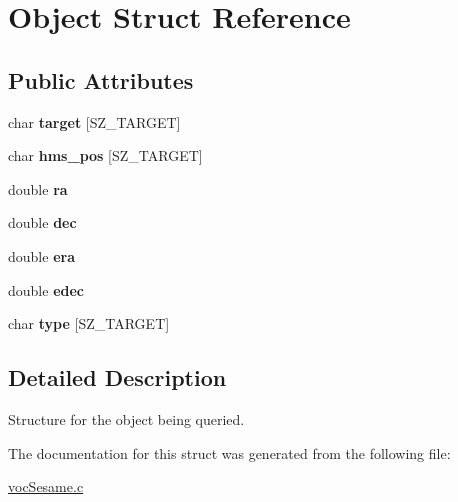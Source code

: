 \hypertarget{structObject}{
\section{Object Struct Reference}
\label{structObject}
}
\subsection*{Public Attributes}
\begin{CompactItemize}
\item 
\hypertarget{structObject_a8132cc4ab5e191de82b257172c67c03}{
char \textbf{target} \mbox{[}SZ\_\-TARGET\mbox{]}}
\label{structObject_a8132cc4ab5e191de82b257172c67c03}

\item 
\hypertarget{structObject_607a5e695e1b0f9a077b76b0d640e23a}{
char \textbf{hms\_\-pos} \mbox{[}SZ\_\-TARGET\mbox{]}}
\label{structObject_607a5e695e1b0f9a077b76b0d640e23a}

\item 
\hypertarget{structObject_4d7b960d76d5ea50bb92efedc3c68878}{
double \textbf{ra}}
\label{structObject_4d7b960d76d5ea50bb92efedc3c68878}

\item 
\hypertarget{structObject_a6e49034ae594ec8685489ea90cc2bac}{
double \textbf{dec}}
\label{structObject_a6e49034ae594ec8685489ea90cc2bac}

\item 
\hypertarget{structObject_2cb904c8ddcab5a9e3a9d3eca0e29083}{
double \textbf{era}}
\label{structObject_2cb904c8ddcab5a9e3a9d3eca0e29083}

\item 
\hypertarget{structObject_f5a95e66e7737fb043264861e9a251f2}{
double \textbf{edec}}
\label{structObject_f5a95e66e7737fb043264861e9a251f2}

\item 
\hypertarget{structObject_c87f83c0327f534da1613be4bff610f5}{
char \textbf{type} \mbox{[}SZ\_\-TARGET\mbox{]}}
\label{structObject_c87f83c0327f534da1613be4bff610f5}

\end{CompactItemize}


\subsection{Detailed Description}
Structure for the object being queried. 

The documentation for this struct was generated from the following file:\begin{CompactItemize}
\item 
\hyperlink{vocSesame_8c}{vocSesame.c}\end{CompactItemize}

